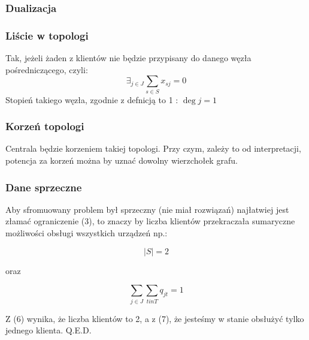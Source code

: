 \documentclass{article}
\begin{document}
\subsubsection{Dualizacja}


\subsubsection{Liście w topologi}
 Tak, jeżeli żaden z klientów nie będzie przypisany do danego węzła pośredniczącego, czyli:
 \begin{equation}
   \exists_{j \in J} \sum_{s \in S} x_{sj} = 0
 \end{equation}
 Stopień takiego węzła, zgodnie z defnicją to 1 : $\deg j = 1$

\subsubsection{Korzeń topologi}

Centrala będzie korzeniem takiej topologi. Przy czym, zależy to od interpretacji, potencja za korzeń można by uznać dowolny wierzchołek grafu.

\subsubsection{Dane sprzeczne}

Aby sfromuowany problem był sprzeczny (nie miał rozwiązań) najłatwiej jest złamać ograniczenie (3),
to znaczy by liczba klientów przekraczała sumaryczne możliwości obsługi wszystkich urządzeń np.:

\begin{equation}
  |S| = 2
\end{equation}

oraz

\begin{equation}
  \sum_{j \in J} \sum_{t in T} q_{jt} = 1
\end{equation}

Z (6) wynika, że liczba klientów to 2, a z (7), że jesteśmy w stanie obsłużyć tylko jednego klienta. Q.E.D.
\end{document}
